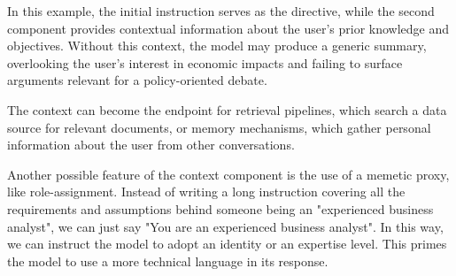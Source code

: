 In this example, the initial instruction serves as the directive, while the second component provides contextual information about the user's prior knowledge and objectives.
Without this context, the model may produce a generic summary, overlooking the user's interest in economic impacts and failing to surface arguments relevant for a policy-oriented debate.

The context can become the endpoint for retrieval pipelines, which search a data source for 
relevant documents, or memory mechanisms, which gather personal information about the user from other conversations. 

Another possible feature of the context component is the use of a memetic proxy\cite{reynolds2021promptprogramminglargelanguage},
like role-assignment. Instead of writing a long instruction covering all the requirements and assumptions 
behind someone being an "experienced business analyst", we can just say "You are an experienced business analyst".
In this way, we can instruct the model to adopt an identity or an expertise level.
This primes the model to use a more technical language in its response.

